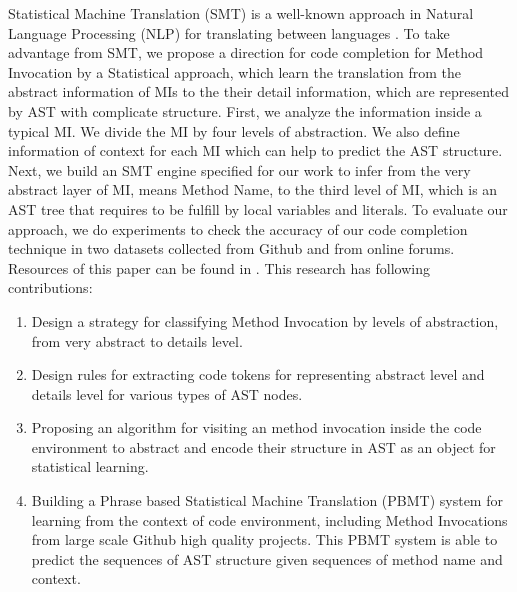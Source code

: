 Statistical Machine Translation (SMT) is a well-known approach in Natural Language Processing (NLP) for translating between languages \cite{Green2014}. To take advantage from SMT, we propose a direction for code completion for Method Invocation by a Statistical approach, which learn the translation from the abstract information of MIs to the their detail information, which are represented by AST with complicate structure. First, we analyze the information inside a typical MI. We divide the MI by four levels of abstraction. We also define information of context for each MI which can help to predict the AST structure. Next, we build an SMT engine specified for our work to infer from the very abstract layer of MI, means Method Name, to the third level of MI, which is an AST tree that requires to be fulfill by local variables and literals. To evaluate our approach, we do experiments to check the accuracy of our code completion technique in two datasets collected from Github and from online forums. Resources of this paper can be found in \cite{id:InvocMap}. This research has following contributions:
\begin{enumerate}
  \item Design a strategy for classifying Method Invocation by levels of abstraction, from very abstract to details level.
  \item Design rules for extracting code tokens for representing abstract level and details level for various types of AST nodes.
  \item Proposing an algorithm for visiting an method invocation inside the code environment to abstract and encode their structure in AST as an object for statistical learning.
  \item Building a Phrase based Statistical Machine Translation (PBMT) system for learning from the context of code environment, including Method Invocations from large scale Github high quality projects. This PBMT system is able to predict the sequences of AST structure given sequences of method name and context.  
\end{enumerate}




